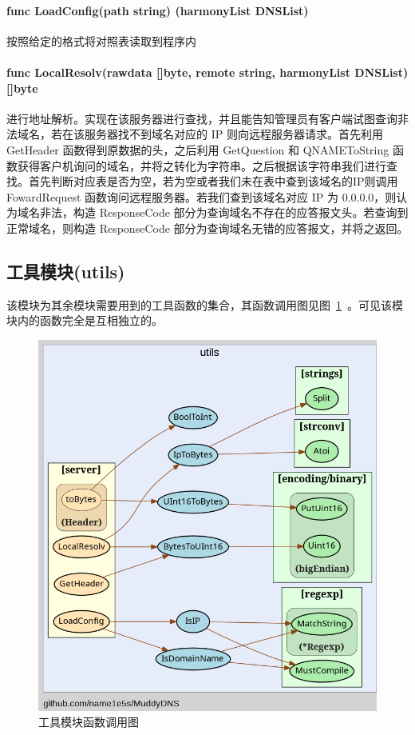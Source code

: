\documentclass[blue,normal,cn]{elegantnote}
\begin{document}
\paragraph{func LoadConfig(path string) (harmonyList DNSList)} 按照给定的格式将对照表读取到程序内

\paragraph{func LocalResolv(rawdata []byte, remote string, harmonyList DNSList) []byte} 进行地址解析。实现在该服务器进行查找，并且能告知管理员有客户端试图查询非法域名，若在该服务器找不到域名对应的 IP 则向远程服务器请求。首先利用 GetHeader 函数得到原数据的头，之后利用 GetQuestion 和 QNAMEToString 函数获得客户机询问的域名，并将之转化为字符串。之后根据该字符串我们进行查找。首先判断对应表是否为空，若为空或者我们未在表中查到该域名的IP则调用 FowardRequest 函数询问远程服务器。若我们查到该域名对应 IP 为 0.0.0.0，则认为域名非法，构造 ResponseCode 部分为查询域名不存在的应答报文头。若查询到正常域名，则构造 ResponseCode 部分为查询域名无错的应答报文，并将之返回。

\subsection{工具模块(utils)}
该模块为其余模块需要用到的工具函数的集合，其函数调用图见图~\ref{call_utils}~。可见该模块内的函数完全是互相独立的。

\begin{figure}[!htbp]
	\centering
	\includegraphics[width=.9\textwidth]{call_utils.png}
	\caption{工具模块函数调用图}
	\label{call_utils}
\end{figure}
\end{document}
